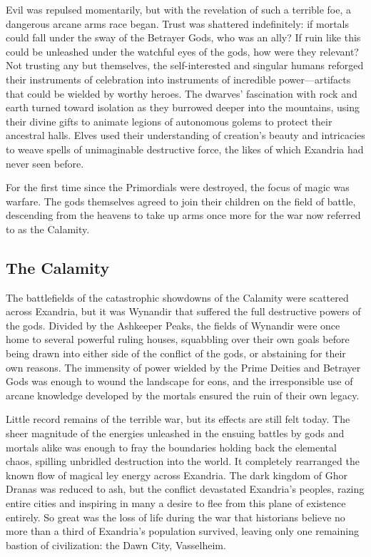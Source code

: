 \documentclass[10pt,a4paper,twoside,bg=print,twocolumn,openany,nodeprecatedcode]{dndbook}
\begin{document}
Evil was repulsed momentarily, but with the revelation of such a terrible foe, a dangerous arcane arms race began. Trust was shattered indefinitely: if mortals could fall under the sway of the Betrayer Gods, who was an ally? If ruin like this could be unleashed under the watchful eyes of the gods, how were they relevant? Not trusting any but themselves, the self-interested and singular humans reforged their instruments of celebration into instruments of incredible power—artifacts that could be wielded by worthy heroes. The dwarves' fascination with rock and earth turned toward isolation as they burrowed deeper into the mountains, using their divine gifts to animate legions of autonomous golems to protect their ancestral halls. Elves used their understanding of creation's beauty and intricacies to weave spells of unimaginable destructive force, the likes of which Exandria had never seen before.

For the first time since the Primordials were destroyed, the focus of magic was warfare. The gods themselves agreed to join their children on the field of battle, descending from the heavens to take up arms once more for the war now referred to as the Calamity.

\subsection{The Calamity}
The battlefields of the catastrophic showdowns of the Calamity were scattered across Exandria, but it was Wynandir that suffered the full destructive powers of the gods. Divided by the Ashkeeper Peaks, the fields of Wynandir were once home to several powerful ruling houses, squabbling over their own goals before being drawn into either side of the conflict of the gods, or abstaining for their own reasons. The immensity of power wielded by the Prime Deities and Betrayer Gods was enough to wound the landscape for eons, and the irresponsible use of arcane knowledge developed by the mortals ensured the ruin of their own legacy.

Little record remains of the terrible war, but its effects are still felt today. The sheer magnitude of the energies unleashed in the ensuing battles by gods and mortals alike was enough to fray the boundaries holding back the elemental chaos, spilling unbridled destruction into the world. It completely rearranged the known flow of magical ley energy across Exandria. The dark kingdom of Ghor Dranas was reduced to ash, but the conflict devastated Exandria's peoples, razing entire cities and inspiring in many a desire to flee from this plane of existence entirely. So great was the loss of life during the war that historians believe no more than a third of Exandria's population survived, leaving only one remaining bastion of civilization: the Dawn City, Vasselheim.
\end{document}
